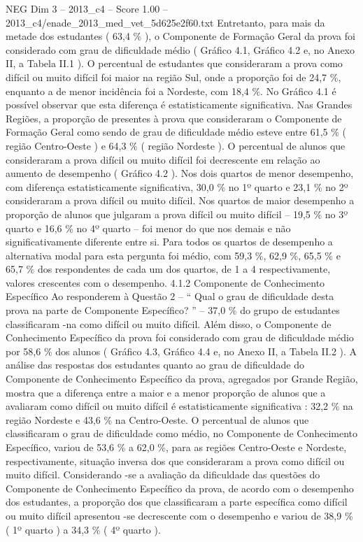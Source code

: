 \begin{textsample}{NEG Dim 3 – 2013\_c4 – Score 1.00 – 2013\_c4/enade\_2013\_med\_vet\_5d625e2f60.txt}
Entretanto, para mais da metade dos estudantes ( 63,4 \% ), o Componente de Formação Geral da prova foi considerado com grau de dificuldade médio ( Gráfico 4.1, Gráfico 4.2 e, no Anexo II, a Tabela II.1 ).
O percentual de estudantes que consideraram a prova como difícil ou muito difícil foi maior na região Sul, onde a proporção foi de 24,7 \%, enquanto a de menor incidência foi a Nordeste, com 18,4 \%.
No Gráfico 4.1 é possível observar que esta diferença é estatisticamente significativa.
Nas Grandes Regiões, a proporção de presentes à prova que consideraram o Componente de Formação Geral como sendo de grau de dificuldade médio esteve entre 61,5 \% ( região Centro-Oeste ) e 64,3 \% ( região Nordeste ).
O percentual de alunos que consideraram a prova difícil ou muito difícil foi decrescente em relação ao aumento de desempenho ( Gráfico 4.2 ).
Nos dois quartos de menor desempenho, com diferença estatisticamente significativa, 30,0 \% no 1º quarto e 23,1 \% no 2º consideraram a prova difícil ou muito difícil.
Nos quartos de maior desempenho a proporção de alunos que julgaram a prova difícil ou muito difícil – 19,5 \% no 3º quarto e 16,6 \% no 4º quarto – foi menor do que nos demais e não significativamente diferente entre si.
Para todos os quartos de desempenho a alternativa modal para esta pergunta foi médio, com 59,3 \%, 62,9 \%, 65,5 \% e 65,7 \% dos respondentes de cada um dos quartos, de 1 a 4 respectivamente, valores crescentes com o desempenho. 4.1.2 Componente de Conhecimento Específico Ao responderem à Questão 2 – “ Qual o grau de dificuldade desta prova na parte de Componente Específico? ” – 37,0 \% do grupo de estudantes classificaram -na como difícil ou muito difícil.
Além disso, o Componente de Conhecimento Específico da prova foi considerado com grau de dificuldade médio por 58,6 \% dos alunos ( Gráfico 4.3, Gráfico 4.4 e, no Anexo II, a Tabela II.2 ).
A análise das respostas dos estudantes quanto ao grau de dificuldade do Componente de Conhecimento Específico da prova, agregados por Grande Região, mostra que a diferença entre a maior e a menor proporção de alunos que a avaliaram como difícil ou muito difícil é estatisticamente significativa : 32,2 \% na região Nordeste e 43,6 \% na Centro-Oeste.
O percentual de alunos que classificaram o grau de dificuldade como médio, no Componente de Conhecimento Específico, variou de 53,6 \% a 62,0 \%, para as regiões Centro-Oeste e Nordeste, respectivamente, situação inversa dos que consideraram a prova como difícil ou muito difícil.
Considerando -se a avaliação da dificuldade das questões do Componente de Conhecimento Específico da prova, de acordo com o desempenho dos estudantes, a proporção dos que classificaram a parte específica como difícil ou muito difícil apresentou -se decrescente com o desempenho e variou de 38,9 \% ( 1º quarto ) a 34,3 \% ( 4º quarto ).

\end{textsample}
